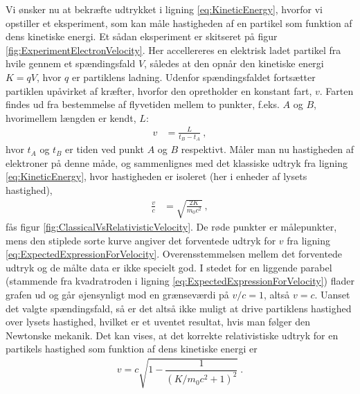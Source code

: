 Vi ønsker nu at bekræfte udtrykket i ligning \eqref{eq:KineticEnergy}, hvorfor vi opstiller et eksperiment, som kan måle hastigheden af en partikel som funktion af dens kinetiske energi. Et sådan eksperiment er skitseret på figur \ref{fig:ExperimentElectronVelocity}. Her accellereres en elektrisk ladet partikel fra hvile gennem et spændingsfald $V$, således at den opnår den kinetiske energi $K = qV$, hvor $q$ er partiklens ladning. Udenfor spændingsfaldet fortsætter partiklen upåvirket af kræfter, hvorfor den opretholder en konstant fart, $v$. Farten findes ud fra bestemmelse af flyvetiden mellem to punkter, f.eks. $A$ og $B$, hvorimellem længden er kendt, $L$:
\begin{align}
v &= \frac{L}{t_B - t_A} \: ,
\end{align}
hvor $t_A$ og $t_B$ er tiden ved punkt $A$ og $B$ respektivt. Måler man nu hastigheden af elektroner på denne måde, og sammenlignes med det klassiske udtryk fra ligning \eqref{eq:KineticEnergy}, hvor hastigheden er isoleret (her i enheder af lysets hastighed),
\begin{align} \label{eq:ExpectedExpressionForVelocity}
\frac{v}{c} &= \sqrt{\frac{2K}{m_0c^2}} \: ,
\end{align}
fås figur \ref{fig:ClassicalVsRelativisticVelocity}. De røde punkter er målepunkter, mens den stiplede sorte kurve angiver det forventede udtryk for $v$ fra ligning \eqref{eq:ExpectedExpressionForVelocity}. Overensstemmelsen mellem det forventede udtryk og de målte data er ikke specielt god. I stedet for en liggende parabel (stammende fra kvadratroden i ligning \eqref{eq:ExpectedExpressionForVelocity}) flader grafen ud og går øjensynligt mod en grænseværdi på $v/c = 1$, altså $v = c$. Uanset det valgte spændingsfald, så er det altså ikke muligt at drive partiklens hastighed over lysets hastighed, hvilket er et uventet resultat, hvis man følger den Newtonske mekanik. Det kan vises, at det korrekte relativistiske udtryk for en partikels hastighed som funktion af dens kinetiske energi er
%
%
\begin{align}
v = c \sqrt{1 - \dfrac{1}{\left(K/m_0c^2 + 1\right)^2}} \: .
\end{align}
